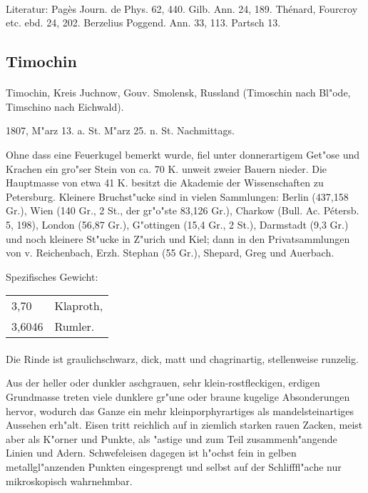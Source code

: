 \documentclass[a4paper, 11pt, oneside]{article}
\begin{document}
\paragraph{}
Literatur: Pagès Journ. de Phys. 62, 440. Gilb. Ann. 24, 189. Thénard, Fourcroy etc. ebd. 24, 202. Berzelius Poggend. Ann. 33, 113. Partsch 13.
\subsection{Timochin}
\normalsize
\paragraph{}
Timochin, Kreis Juchnow, Gouv. Smolensk, Russland (Timoschin nach Bl"ode, Timschino nach Eichwald).

1807, M"arz 13. a. St. M"arz 25. n. St. Nachmittags.

Ohne dass eine Feuerkugel bemerkt wurde, fiel unter donnerartigem Get"ose und Krachen ein gro"ser Stein von ca. 70 K. unweit zweier Bauern nieder. Die Hauptmasse von etwa 41 K. besitzt die Akademie der Wissenschaften zu Petersburg. Kleinere Bruchst"ucke sind in vielen Sammlungen: Berlin (437,158 Gr.), Wien (140 Gr., 2 St., der gr"o"ste 83,126 Gr.), Charkow (Bull. Ac. Pétersb. 5, 198), London (56,87 Gr.), G"ottingen (15,4 Gr., 2 St.), Darmstadt (9,3 Gr.) und noch kleinere St"ucke in Z"urich und Kiel; dann in den Privatsammlungen von v. Reichenbach, Erzh. Stephan (55 Gr.), Shepard, Greg und Auerbach.

Spezifisches Gewicht:
\begin{table}[!ht]
    \centering
    \begin{tabular}{l l}
        3,70 & Klaproth,\\
        3,6046 & Rumler.
    \end{tabular}
\end{table}
\paragraph{}
Die Rinde ist graulichschwarz, dick, matt und chagrinartig, stellenweise runzelig.

Aus der heller oder dunkler aschgrauen, sehr klein-rostfleckigen, erdigen Grundmasse treten viele dunklere gr"une oder braune kugelige Absonderungen hervor, wodurch das Ganze ein mehr kleinporphyrartiges als mandelsteinartiges Aussehen erh"alt. Eisen tritt reichlich auf in ziemlich starken rauen Zacken, meist aber als K"orner und Punkte, als "astige und zum Teil zusammenh"angende Linien und Adern. Schwefeleisen dagegen ist h"ochst fein in gelben metallgl"anzenden Punkten eingesprengt und selbst auf der Schlifffl"ache nur mikroskopisch wahrnehmbar.
\end{document}
